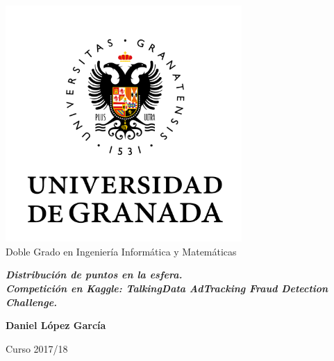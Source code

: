 
\thispagestyle{empty}


\begin{center}

\includegraphics[width=9cm]{simbolo_color.png}\\[2cm]
{\Large\sffamily Doble Grado en Ingeniería Informática y Matemáticas}\\[3mm]


\vspace{2cm}


\begin{Large}
{\slshape\bfseries  Distribución de puntos en la esfera.\\Competición en Kaggle: TalkingData AdTracking Fraud Detection Challenge.\\[6mm]
}
\end{Large}

\vspace{2cm}

\vfill

\begin{large}
{\bf Daniel López García}
\end{large}


\vspace{1.5cm}

\begin{Large}
Curso 2017/18
\end{Large}
\end{center}




